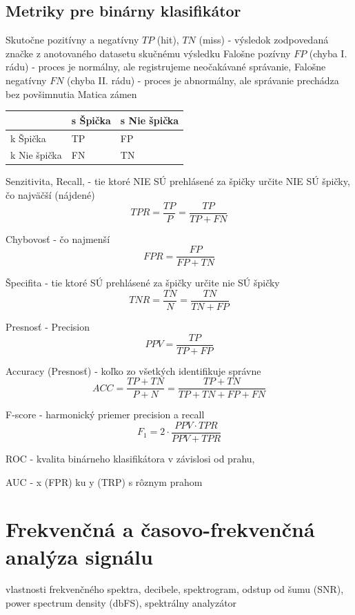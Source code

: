 \subsection{Metriky pre binárny klasifikátor}
Skutočne pozitívny a negatívny $TP$ (hit), $TN$ (miss) - výsledok zodpovedaná značke z anotovaného datasetu skučnému výsledku
Falošne pozívny $FP$ (chyba I. rádu) - proces je normálny, ale registrujeme neočakávané správanie,
Falošne negatívny $FN$ (chyba II. rádu) - proces je abnormálny, ale správanie prechádza bez povšimnutia
Matica zámen 
\begin{table}[]
\begin{tabular}{|l|l|l|}
\hline
             & s Špička & s Nie špička \\ \hline
k Špička     & TP       & FP           \\ \hline
k Nie špička & FN       & TN           \\ \hline
\end{tabular}
\end{table}

Senzitivita, Recall, - tie ktoré NIE SÚ prehlásené za špičky určite NIE SÚ špičky, čo najväčší (nájdené)
$$ TPR = \frac{TP}{P} = \frac{TP}{TP + FN} $$

Chybovosť - čo najmenší
$$  FPR = \frac{FP}{FP + TN}$$

Špecifita - tie ktoré SÚ prehlásené za špičky určite nie SÚ špičky
$$ TNR = \frac{TN}{N} = \frac{TN}{TN + FP} $$

Presnosť - Precision
$$ PPV = \frac{TP}{TP + FP} $$

Accuracy (Presnosť) - koľko zo všetkých identifikuje správne
$$ ACC = \frac{TP + TN}{P + N} = \frac{TP + TN}{TP + TN + FP + FN} $$

F-score - harmonický priemer precision a recall
$$ F_1 = 2 \cdot \frac{PPV \cdot TPR}{PPV + TPR}$$

ROC - kvalita binárneho klasifikátora v závislosi od prahu, 

AUC - x (FPR) ku y (TRP) s rôznym prahom
\cite{anomaly-detection-algorithms}
\cite{wsn-outlier-detection-survey}

\section{Frekvenčná a časovo-frekvenčná analýza signálu}
\cite{time-series-analysis}
vlastnosti frekvenčného spektra,
decibele, 
spektrogram,
odstup od šumu (SNR),
power spectrum density (dbFS),
spektrálny analyzátor

